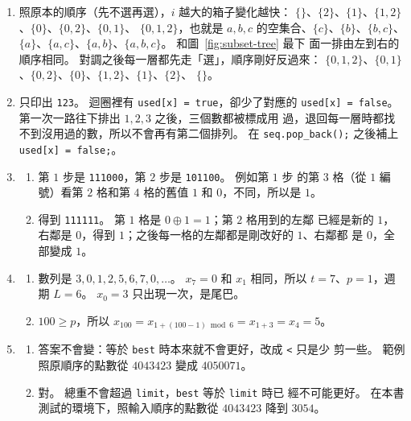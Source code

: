 \begin{enumerate}
\item 照原本的順序（先不選再選），$i$ 越大的箱子變化越快：
$\{\}$、$\{2\}$、$\{1\}$、$\{1, 2\}$、$\{0\}$、$\{0, 2\}$、$\{0, 1\}$、
$\{0, 1, 2\}$，也就是 $a, b, c$ 的空集合、$\{c\}$、$\{b\}$、$\{b, c\}$、
$\{a\}$、$\{a, c\}$、$\{a, b\}$、$\{a, b, c\}$。 和圖~\ref{fig:subset-tree} 最下
面一排由左到右的順序相同。 對調之後每一層都先走「選」，順序剛好反過來：
$\{0, 1, 2\}$、$\{0, 1\}$、$\{0, 2\}$、$\{0\}$、$\{1, 2\}$、$\{1\}$、$\{2\}$、
$\{\}$。

\item 只印出 \texttt{123}。 迴圈裡有 \texttt{used[x] = true}，卻少了對應的
\texttt{used[x] = false}。 第一次一路往下排出 $1, 2, 3$ 之後，三個數都被標成用
過，退回每一層時都找不到沒用過的數，所以不會再有第二個排列。 在
\texttt{seq.pop\_back();} 之後補上 \texttt{used[x] = false;}。

\item
\begin{enumerate}
\item 第 $1$ 步是 \texttt{111000}，第 $2$ 步是 \texttt{101100}。 例如第 $1$ 步
的第 $3$ 格（從 $1$ 編號）看第 $2$ 格和第 $4$ 格的舊值 $1$ 和 $0$，不同，所以是
$1$。
\item 得到 \texttt{111111}。 第 $1$ 格是 $0 \oplus 1 = 1$；第 $2$ 格用到的左鄰
已經是新的 $1$，右鄰是 $0$，得到 $1$；之後每一格的左鄰都是剛改好的 $1$、右鄰都
是 $0$，全部變成 $1$。
\end{enumerate}

\item
\begin{enumerate}
\item 數列是 $3, 0, 1, 2, 5, 6, 7, 0, \ldots$。 $x_7 = 0$ 和 $x_1$ 相同，所以
$t = 7$、$p = 1$，週期 $L = 6$。 $x_0 = 3$ 只出現一次，是尾巴。
\item $100 \ge p$，所以 $x_{100} = x_{1 + (100 - 1) \bmod 6} = x_{1 + 3} =
x_4 = 5$。
\end{enumerate}

\item
\begin{enumerate}
\item 答案不會變：等於 \texttt{best} 時本來就不會更好，改成 \texttt{<} 只是少
剪一些。 範例照原順序的點數從 $4043423$ 變成 $4050071$。
\item 對。 總重不會超過 \texttt{limit}，\texttt{best} 等於 \texttt{limit} 時已
經不可能更好。 在本書測試的環境下，照輸入順序的點數從 $4043423$ 降到 $3054$。
\end{enumerate}
\end{enumerate}
